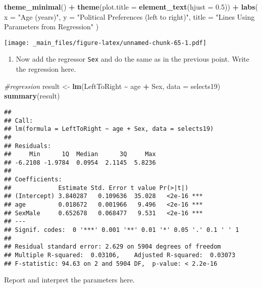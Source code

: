 \documentclass[
]{book}
\newenvironment{Shaded}{\begin{snugshade}}{\end{snugshade}}
\newcommand{\AttributeTok}[1]{\textcolor[rgb]{0.13,0.29,0.53}{#1}}
\newcommand{\CommentTok}[1]{\textcolor[rgb]{0.56,0.35,0.01}{\textit{#1}}}
\newcommand{\FloatTok}[1]{\textcolor[rgb]{0.00,0.00,0.81}{#1}}
\newcommand{\FunctionTok}[1]{\textcolor[rgb]{0.13,0.29,0.53}{\textbf{#1}}}
\newcommand{\NormalTok}[1]{#1}
\newcommand{\OtherTok}[1]{\textcolor[rgb]{0.56,0.35,0.01}{#1}}
\newcommand{\SpecialCharTok}[1]{\textcolor[rgb]{0.81,0.36,0.00}{\textbf{#1}}}
\newcommand{\StringTok}[1]{\textcolor[rgb]{0.31,0.60,0.02}{#1}}
\providecommand{\tightlist}{%
  \setlength{\itemsep}{0pt}\setlength{\parskip}{0pt}}
\begin{document}
\begin{Shaded}
\begin{Highlighting}[]
  \FunctionTok{theme\_minimal}\NormalTok{() }\SpecialCharTok{+}
  \FunctionTok{theme}\NormalTok{(}\AttributeTok{plot.title =} \FunctionTok{element\_text}\NormalTok{(}\AttributeTok{hjust =} \FloatTok{0.5}\NormalTok{)) }\SpecialCharTok{+}
  \FunctionTok{labs}\NormalTok{(}
    \AttributeTok{x =} \StringTok{"Age (years)"}\NormalTok{,}
    \AttributeTok{y =} \StringTok{"Political Preferences (left to right)"}\NormalTok{,}
    \AttributeTok{title =} \StringTok{"Lines Using Parameters from Regression"}
\NormalTok{  )}
\end{Highlighting}
\end{Shaded}

\texttt{[image: \_main\_files/figure-latex/unnamed-chunk-65-1.pdf]}

\begin{enumerate}
\def\labelenumi{\arabic{enumi}.}
\setcounter{enumi}{3}
\tightlist
\item
  Now add the regressor \texttt{Sex} and do the same as in the previous point.
  Write the regression here.
\end{enumerate}

\begin{Shaded}
\begin{Highlighting}[]
\CommentTok{\#regression}
\NormalTok{result }\OtherTok{\textless{}{-}} \FunctionTok{lm}\NormalTok{(LeftToRight }\SpecialCharTok{\textasciitilde{}}\NormalTok{ age }\SpecialCharTok{+}\NormalTok{ Sex, }\AttributeTok{data =}\NormalTok{ selects19)}
\FunctionTok{summary}\NormalTok{(result)}
\end{Highlighting}
\end{Shaded}

\begin{verbatim}
## 
## Call:
## lm(formula = LeftToRight ~ age + Sex, data = selects19)
## 
## Residuals:
##     Min      1Q  Median      3Q     Max 
## -6.2108 -1.9784  0.0954  2.1145  5.8236 
## 
## Coefficients:
##             Estimate Std. Error t value Pr(>|t|)    
## (Intercept) 3.840287   0.109636  35.028   <2e-16 ***
## age         0.018672   0.001966   9.496   <2e-16 ***
## SexMale     0.652678   0.068477   9.531   <2e-16 ***
## ---
## Signif. codes:  0 '***' 0.001 '**' 0.01 '*' 0.05 '.' 0.1 ' ' 1
## 
## Residual standard error: 2.629 on 5904 degrees of freedom
## Multiple R-squared:  0.03106,    Adjusted R-squared:  0.03073 
## F-statistic: 94.63 on 2 and 5904 DF,  p-value: < 2.2e-16
\end{verbatim}

Report and interpret the parameters here.
\end{document}
